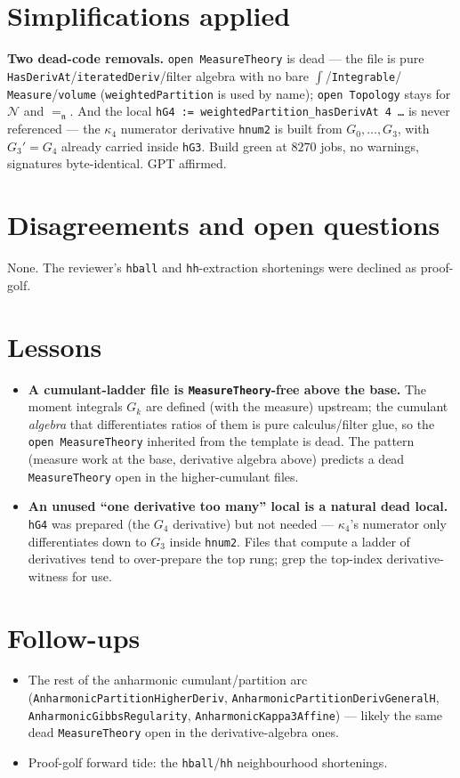 \documentclass[11pt]{article}
\begin{document}
\section{Simplifications applied}
\textbf{Two dead-code removals.} \texttt{open MeasureTheory} is dead --- the file is pure
\texttt{HasDerivAt}/\texttt{iteratedDeriv}/filter algebra with no bare $\int$/\texttt{Integrable}/%
\texttt{Measure}/\texttt{volume} (\texttt{weightedPartition} is used by name); \texttt{open
Topology} stays for $\mathcal N$ and $=_{\!\!\mathfrak n}$. And the local \texttt{hG4 :=
weightedPartition\_hasDerivAt 4 \dots} is never referenced --- the $\kappa_4$ numerator derivative
\texttt{hnum2} is built from $G_0,\dots,G_3$, with $G_3'=G_4$ already carried inside \texttt{hG3}.
Build green at $8270$ jobs, no warnings, signatures byte-identical. GPT affirmed.

\section{Disagreements and open questions}
None. The reviewer's \texttt{hball} and \texttt{hh}-extraction shortenings were declined as
proof-golf.

\section{Lessons}
\begin{itemize}[noitemsep]
  \item \textbf{A cumulant-ladder file is \texttt{MeasureTheory}-free above the base.} The moment
    integrals $G_k$ are defined (with the measure) upstream; the cumulant \emph{algebra} that
    differentiates ratios of them is pure calculus/filter glue, so the \texttt{open MeasureTheory}
    inherited from the template is dead. The pattern (measure work at the base, derivative algebra
    above) predicts a dead \texttt{MeasureTheory} open in the higher-cumulant files.
  \item \textbf{An unused ``one derivative too many'' local is a natural dead local.} \texttt{hG4}
    was prepared (the $G_4$ derivative) but not needed --- $\kappa_4$'s numerator only differentiates
    down to $G_3$ inside \texttt{hnum2}. Files that compute a ladder of derivatives tend to
    over-prepare the top rung; grep the top-index derivative-witness for use.
\end{itemize}

\section{Follow-ups}
\begin{itemize}[noitemsep]
  \item The rest of the anharmonic cumulant/partition arc
    (\texttt{AnharmonicPartitionHigherDeriv}, \texttt{AnharmonicPartitionDerivGeneralH},
    \texttt{AnharmonicGibbsRegularity}, \texttt{AnharmonicKappa3Affine}) --- likely the same dead
    \texttt{MeasureTheory} open in the derivative-algebra ones.
  \item Proof-golf forward tide: the \texttt{hball}/\texttt{hh} neighbourhood shortenings.
\end{itemize}
\end{document}
